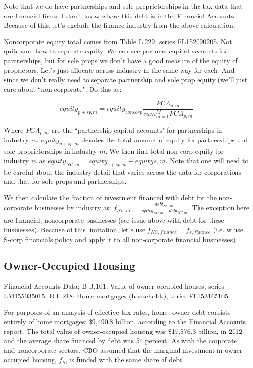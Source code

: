 \documentclass[article,11pt,letterpaper,fleqn]{article}
\theoremstyle{definition}
\numberwithin{equation}{section}
\begin{document}
Note that we do have partnerships and sole proprietorships in the tax data that are financial firms.  I don't know where this debt is in the Financial Accounts.  Because of this, let's exclude the finance industry from the above calculation. 

Noncorporate equity total comes from Table L.229, series FL152090205.  Not quite sure how to separate equity.  We can see partners capital accounts for partnerships, but for sole props we don't have a good measure of the equity of proprietors.  Let's just allocate across industry in the same way for each.  And since we don't really need to separate partnership and sole prop equity (we'll just care about ``non-corporate".  Do this as: 

\begin{equation}
equity_{p+sp,m} = equity_{noncorp}\frac{PCA_{p,m}}{sum_{m=1}^{M}PCA_{p,m}}
\end{equation}

Where $PCA_{p,m}$ are the ``partnership capital accounts" for partnerships in industry $m$.  $equity_{p+sp,m}$ denotes the total amount of equity for partnerships and sole proprietorships in industry $m$.  We then find total non-corp equity for industry $m$ as $equity_{NC,m} = equity_{p+sp,m} + equity{s,m}$.  Note that one will need to be careful about the industry detail that varies across the data for corporations and that for sole props and partnerships.

We then calculate the fraction of investment financed with debt for the non-corporate businesses by industry as: $f_{NC,m} = \frac{debt_{NC,m}}{equity_{NC,m}+debt_{NC,m}}$.  The exception here are financial, noncorporate businesses (see issue above with debt for these businesses).  Because of this limitation, let's use $f_{NC,finance}=f_{s,finance}$ (i.e. w use S-corp financials policy and apply it to all non-corporate financial businesses).


\subsection{Owner-Occupied Housing} 

Financial Accounts Data:
B B.101: Value of owner-occupied houses, series LM155035015;
B L.218: Home mortgages (households), series FL153165105

For purposes of an analysis of effective tax rates, home- owner debt consists entirely of home mortgages: \$9,490.8 billion, according to the Financial Accounts report. The total value of owner-occupied housing was \$17,576.3 billion, in 2012 and the average share financed by debt was 54 percent. As with the corporate and noncorporate sectors, CBO assumed that the marginal investment in owner- occupied housing, $f_{h}$, is funded with the same share of debt.
\end{document}
